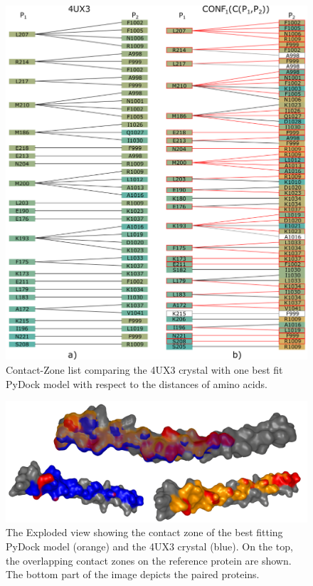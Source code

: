 \documentclass{bmcart}
\def\ExpView {Exploded view\xspace}
\def\CoZoList{Contact-Zone list\xspace}
\begin{document}
\begin{backmatter}
\begin{figure}[h!]
    \centering
  \includegraphics[width=0.9\columnwidth]{images/figure13.pdf}
    \caption{ \CoZoList comparing the 4UX3 crystal with one best fit PyDock model with respect to the distances of amino acids.}
  \label{fig:coiled2}
\end{figure}

\begin{figure}[!h]
  \centering
  \includegraphics[width=0.9\columnwidth]{images/figure14.png}
  \caption{ The \ExpView showing the contact zone of the best fitting PyDock model (orange) and the 4UX3 crystal (blue). On the top, the overlapping contact zones on the reference protein are shown. The bottom part of the image depicts the paired proteins.}
  \label{fig:selection_4_final_SMC3_PyDock}
\end{figure}


\end{backmatter}
\end{document}
